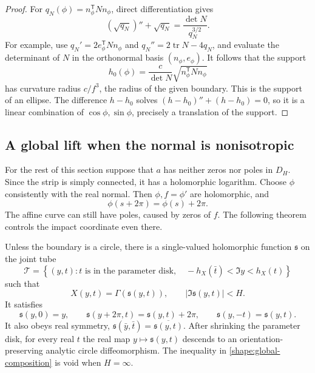 \begin{proof}
For \(q_N(\phi)=n_\phi^{\mathsf T}Nn_\phi\), direct differentiation
gives
\[
 \left(\sqrt{q_N}\right)''+\sqrt{q_N}
 =\frac{\det N}{q_N^{3/2}}.
\]
For example, use \(q_N'=2e_\phi^{\mathsf T}Nn_\phi\) and
\(q_N''=2\operatorname{tr}N-4q_N\), and evaluate the determinant of
\(N\) in the orthonormal basis \((n_\phi,e_\phi)\). It follows that
the support
\[
 h_0(\phi)=\frac{c}{\det N}\sqrt{n_\phi^{\mathsf T}Nn_\phi}
\]
has curvature radius \(c/f^3\), the radius of the given boundary.
This is the support of an ellipse. The difference \(h-h_0\) solves
\((h-h_0)''+(h-h_0)=0\), so it is a linear combination of
\(\cos\phi,\sin\phi\), precisely a translation of the support.
\end{proof}

\subsection{A global lift when the normal is nonisotropic}

For the rest of this section suppose that \(a\) has neither zeros
nor poles in \(D_H\). Since the strip is simply connected, it has a
holomorphic logarithm. Choose \(\phi\) consistently with the real
normal. Then \(\phi,f=\phi'\) are holomorphic, and
\[
 \phi(s+2\pi)=\phi(s)+2\pi.
\]
The affine curve can still have poles, caused by zeros of \(f\).
The following theorem controls the impact coordinate even there.

\begin{theorem}
\label{thm:shape-lift}
Unless the boundary is a circle, there is a single-valued holomorphic
function \(\mathfrak s\) on the joint tube
\begin{equation}
 \mathcal T=\left\{(y,t):t\text{ is in the parameter disk},\quad
 -h_X(\bar t)<\Im y<h_X(t)\right\}
 \label{shape:joint-tube}
\end{equation}
such that
\begin{equation}
 X(y,t)=\Gamma(\mathfrak s(y,t)),\qquad
 |\Im\mathfrak s(y,t)|<H.
 \label{shape:global-composition}
\end{equation}
It satisfies
\begin{equation}
 \mathfrak s(y,0)=y,\qquad
 \mathfrak s(y+2\pi,t)=\mathfrak s(y,t)+2\pi,\qquad
 \mathfrak s(y,-t)=\mathfrak s(y,t).
 \label{shape:lift-symmetries}
\end{equation}
It also obeys real symmetry,
\(\mathfrak s(\bar y,\bar t)=\overline{\mathfrak s(y,t)}\).
After shrinking the parameter disk, for every real \(t\) the real
map \(y\mapsto\mathfrak s(y,t)\) descends to an orientation-preserving
analytic circle diffeomorphism. The inequality in
\eqref{shape:global-composition} is void when \(H=\infty\).
\end{theorem}

